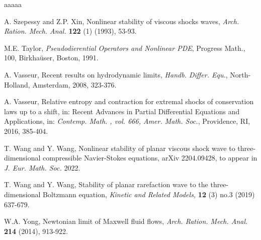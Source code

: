 \documentclass[10pt,reqno]{amsart}
\numberwithin{equation}{section}
\begin{document}
\begin{thebibliography}{aaaaa}


  A. Szepessy and Z.P. Xin, Nonlinear stability of viscous shocks waves, {\it Arch. Ration. Mech. Anal.} {\bf 122} (1) (1993), 53-93.



 M.E. Taylor, {\it Pseudodierential Operators and Nonlinear PDE}, Progress Math., 100, Birkha\"user, Boston, 1991.

 A. Vasseur, Recent results on hydrodynamic limits, {\it Handb. Differ. Equ.}, North-Holland, Amsterdam, 2008, 323-376.

 A. Vasseur, Relative entropy and contraction for extremal shocks of conservation laws up to a shift, in: Recent Advances in Partial Differential Equations and Applications, in: {\it Contemp. Math. , vol. 666, Amer. Math. Soc.}, Providence, RI, 2016, 385-404.

 T. Wang and Y. Wang, Nonlinear stability of planar viscous shock wave to three-dimensional compressible Navier-Stokes equations, arXiv 2204.09428, to appear in {\it J. Eur. Math. Soc.} 2022.

 T. Wang and Y. Wang, Stability of planar rarefaction wave to the three-dimensional Boltzmann equation, {\it Kinetic and Related Models,} {\bf 12} (3) no.3 (2019) 637-679.

  W.A. Yong, Newtonian limit of Maxwell fluid flows, {\it Arch. Ration. Mech. Anal.} {\bf 214}  (2014), 913-922.
\end{thebibliography}
\end{document}
